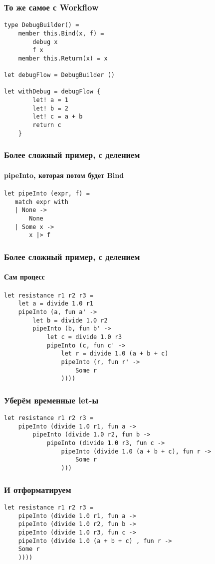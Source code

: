 \documentclass{../../slides-style}
\begin{document}
    \begin{frame}[fragile]
        \frametitle{То же самое с Workflow}
        \begin{verbatim}
type DebugBuilder() =
    member this.Bind(x, f) = 
        debug x 
        f x
    member this.Return(x) = x

let debugFlow = DebugBuilder ()

let withDebug = debugFlow {
        let! a = 1
        let! b = 2
        let! c = a + b
        return c
    }
        \end{verbatim}
    \end{frame}

    \begin{frame}[fragile]
        \frametitle{Более сложный пример, с делением}
        \framesubtitle{pipeInto, которая потом будет Bind}
        \begin{verbatim}
let pipeInto (expr, f) =
   match expr with
   | None -> 
       None
   | Some x -> 
       x |> f
        \end{verbatim}
    \end{frame}

    \begin{frame}[fragile]
        \frametitle{Более сложный пример, с делением}
        \framesubtitle{Сам процесс}
        \begin{verbatim}
let resistance r1 r2 r3 = 
    let a = divide 1.0 r1
    pipeInto (a, fun a' ->
        let b = divide 1.0 r2
        pipeInto (b, fun b' ->
            let c = divide 1.0 r3
            pipeInto (c, fun c' ->
                let r = divide 1.0 (a + b + c)
                pipeInto (r, fun r' ->
                    Some r
                ))))
        \end{verbatim}
    \end{frame}

    \begin{frame}[fragile]
        \frametitle{Уберём временные let-ы}
        \begin{verbatim}
let resistance r1 r2 r3 = 
    pipeInto (divide 1.0 r1, fun a ->
        pipeInto (divide 1.0 r2, fun b ->
            pipeInto (divide 1.0 r3, fun c ->
                pipeInto (divide 1.0 (a + b + c), fun r ->
                    Some r
                )))
        \end{verbatim}
    \end{frame}

    \begin{frame}[fragile]
        \frametitle{И отформатируем}
        \begin{verbatim}
let resistance r1 r2 r3 = 
    pipeInto (divide 1.0 r1, fun a ->
    pipeInto (divide 1.0 r2, fun b ->
    pipeInto (divide 1.0 r3, fun c ->
    pipeInto (divide 1.0 (a + b + c) , fun r ->
    Some r
    ))))
        \end{verbatim}
    \end{frame}
\end{document}

